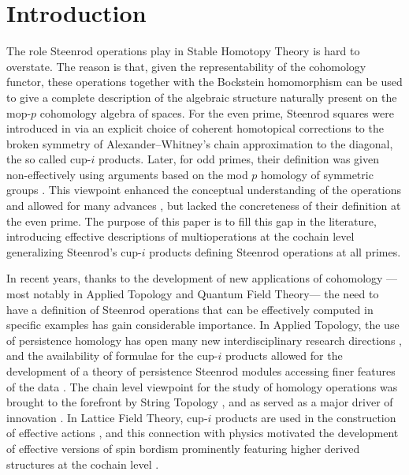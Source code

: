 
\section{Introduction} \label{s:introduction}

The role Steenrod operations play in Stable Homotopy Theory is hard to overstate.
The reason is that, given the representability of the cohomology functor, these operations together with the Bockstein homomorphism can be used to give a complete description of the algebraic structure naturally present on the mop-$p$ \mbox{cohomology} algebra of spaces.
For the even prime, Steenrod squares were introduced in \cite{steenrod47products} via an explicit choice of coherent homotopical corrections to the broken symmetry of Alexander--Whitney's chain approximation to the diagonal, the so called cup-$i$ products.
Later, for odd primes, their definition was given non-effectively using arguments based on the mod $p$ homology of symmetric groups \cites{steenrod53symmetric, steenrod53cyclic, steenrod62operations}.
This viewpoint enhanced the conceptual understanding of the operations and allowed for many advances \cites{adem1952iteration, milnor1958dual, adams1995stable}, but lacked the concreteness of their definition at the even prime.
The purpose of this paper is to fill this gap in the literature, introducing effective descriptions of multioperations at the cochain level generalizing Steenrod's cup-$i$ products defining Steenrod operations at all primes.

In recent years, thanks to the development of new applications of cohomology ---most notably in Applied Topology and Quantum Field Theory--- the need to have a definition of Steenrod operations that can be effectively computed in specific examples has gain considerable importance.
In Applied Topology, the use of persistence homology \cites{carlsson2009data, edelsbrunner2008persistent} has open many new interdisciplinary research directions \cites{de2007coverage, chan2013topology, lee2017quantifying}, and the availability of formulae for the cup-$i$ products allowed for the development of a theory of persistence Steenrod modules accessing finer features of the data \cite{medina2018persistence}.
The chain level viewpoint for the study of homology operations was brought to the forefront by String Topology \cite{Sullivanoverview}, and as served as a major driver of innovation \cites{TZ, hoch2}.
In Lattice Field Theory, cup-$i$ products are used in the construction of effective actions \cite{gaiotto2016spin, bhardwaj2017state, kapustin2017fermionic}, and this connection with physics motivated the development of effective versions of spin bordism \cites{brumfiel2016pontrjagin, brumfiel2018pontrjagin} prominently featuring higher derived structures at the cochain level \cite{medina2020cartan, medina2020adem}.

